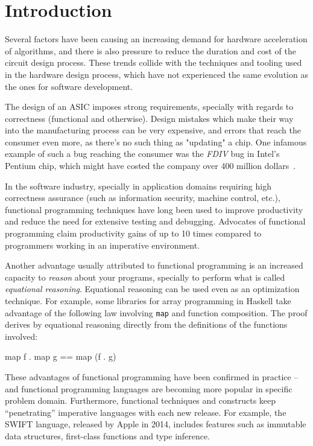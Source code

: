 \chapter{Introduction}
\label{chap:intro}
    Several factors have been causing an increasing demand for hardware acceleration of algorithms,
    and there is also pressure to reduce the duration and cost of the circuit design process.
    These trends collide with the techniques and tooling used in the hardware design process,
    which have not experienced the same evolution as the ones for software development.

    The design of an \ac{ASIC} imposes strong requirements,
    specially with regards to correctness (functional and otherwise).
    Design mistakes which make their way into the manufacturing process can be very expensive,
    and errors that reach the consumer even more, as there's no such thing as "updating" a chip.
    One infamous example of such a bug reaching the consumer was the \emph{FDIV} bug in Intel's Pentium chip,
    which might have costed the company over 400 million dollars~\cite{intel-fdiv}.

    In the software industry, specially in application domains requiring high correctness assurance
    (such as information security, machine control, etc.),
    functional programming techniques have long been used to improve productivity
    and reduce the need for extensive testing and debugging.
    Advocates of functional programming claim productivity gains of up to 10 times compared to
    programmers working in an imperative environment.

    Another advantage usually attributed to functional programming is an increased capacity to
    \emph{reason} about your programs, specially to perform what is called \emph{equational reasoning}.
    Equational reasoning can be used even as an optimization technique.
    For example, some libraries for array programming in Haskell take advantage of the following
    law involving \texttt{map} and function composition.
    The proof derives by equational reasoning directly from the definitions of the functions involved:

    \begin{haskellcode}
        map f . map g == map (f . g)
    \end{haskellcode}

    These advantages of functional programming have been confirmed in practice -- and functional programming
    languages are becoming more popular in specific problem domain.
    Furthermore, functional techniques and constructs keep ``penetrating'' imperative languages
    with each new release. For example, the SWIFT language, released by Apple in 2014,
    includes features such as immutable data structures, first-class functions and type inference.

